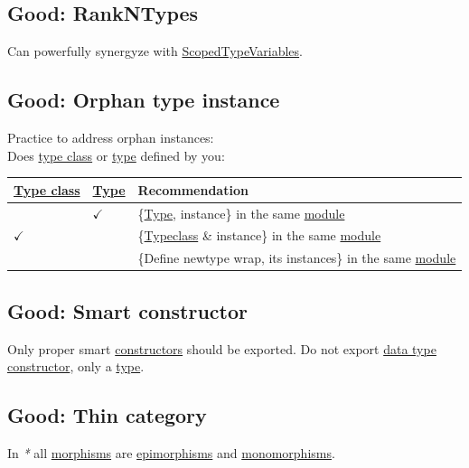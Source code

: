 \documentclass[11pt]{article}
\begin{document}
\subsection{\label{orgf3585f3}Good: RankNTypes}
\label{sec:org048fdab}
Can powerfully synergyze with \hyperref[org1f3d5d9]{ScopedTypeVariables}.\\

\subsection{\label{orgd5e2301}Good: Orphan type instance}
\label{sec:org5b0a964}
Practice to address orphan instances:\\

Does \hyperref[orga4a5066]{type class} or \hyperref[org4fbaeb8]{type} defined by you:\\
\begin{center}
\begin{tabular}{lll}
\hyperref[orga4a5066]{Type class} & \hyperref[org4fbaeb8]{Type} & Recommendation\\
\hline
 & \(\checkmark\) & \{\hyperref[org4fbaeb8]{Type}, instance\} in the same \hyperref[orgde475c6]{module}\\
\(\checkmark\) &  & \{\hyperref[orgd448256]{Typeclass} \& instance\} in the same \hyperref[orgde475c6]{module}\\
 &  & \{Define newtype wrap, its instances\} in the same \hyperref[orgde475c6]{module}\\
\end{tabular}
\end{center}

\subsection{\label{org4ef5611}Good: Smart constructor}
\label{sec:orgc94eafe}
Only proper smart \hyperref[orgc5bd814]{constructors} should be exported. Do not export \hyperref[org965cde3]{data type} \hyperref[orgd019743]{constructor}, only a \hyperref[org4fbaeb8]{type}.\\

\subsection{\label{org2b3cf36}Good: Thin category}
\label{sec:orga34103b}
In \emph{*} all \hyperref[org8ed0ce8]{morphisms} are \hyperref[org94b12ab]{epimorphisms} and \hyperref[orgfde584a]{monomorphisms}.\\
\end{document}
